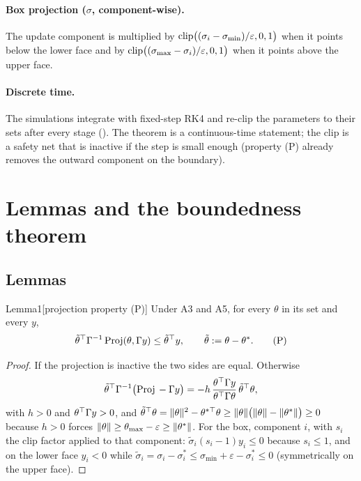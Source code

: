 \paragraph{Box projection ($\sigma$, component-wise).} The update component is multiplied by
$\operatorname{clip}\bigl((\sigma_i-\sigma_{\min})/\varepsilon,0,1\bigr)$ when it points below the lower face and by
$\operatorname{clip}\bigl((\sigma_{\max}-\sigma_i)/\varepsilon,0,1\bigr)$ when it points above the upper face.

\paragraph{Discrete time.} The simulations integrate with fixed-step RK4 and re-clip the parameters to their sets after
every stage (). The theorem is a continuous-time statement; the clip is a safety net that
is inactive if the step is small enough (property (P) already removes the outward component on the boundary).

\section{Lemmas and the boundedness theorem}\label{sec:p1-theorem}

\subsection{Lemmas}

\begin{thm}{Lemma}{1}[projection property (P)]
Under A3 and A5, for every $\theta$ in its set and every $y$,
\begin{equation}
\tilde\theta^\top\Gamma^{-1}\operatorname{Proj}(\theta,\Gamma y)\le\tilde\theta^\top y,
\qquad \tilde\theta:=\theta-\theta^*. \tag{P}
\end{equation}
\end{thm}

\begin{proof}
If the projection is inactive the two sides are equal. Otherwise
\[
\tilde\theta^\top\Gamma^{-1}\bigl(\operatorname{Proj}{}-\Gamma y\bigr)
=-h\,\frac{\theta^\top\Gamma y}{\theta^\top\Gamma\theta}\,\tilde\theta^\top\theta,
\]
with $h>0$ and $\theta^\top\Gamma y>0$, and
$\tilde\theta^\top\theta=\lVert \theta\rVert^2-\theta^{*\top}\theta\ge\lVert \theta\rVert\bigl(\lVert \theta\rVert-\lVert \theta^*\rVert\bigr)\ge0$
because $h>0$ forces $\lVert \theta\rVert\ge\theta_{\max}-\varepsilon\ge\lVert \theta^*\rVert$. For the box, component $i$, with
$s_i$ the clip factor applied to that component: $\tilde\sigma_i(s_i-1)y_i\le0$ because $s_i\le1$, and on the lower
face $y_i<0$ while $\tilde\sigma_i=\sigma_i-\sigma^*_i\le\sigma_{\min}+\varepsilon-\sigma^*_i\le0$ (symmetrically on
the upper face).
\end{proof}

